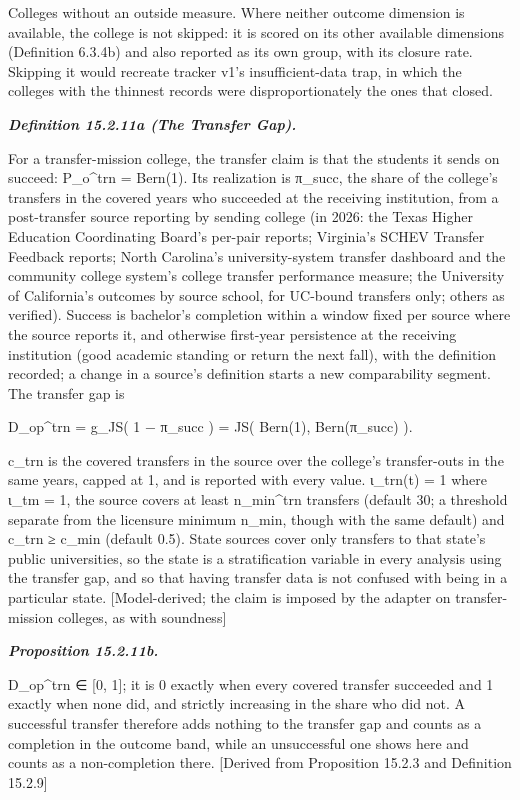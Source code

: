 \documentclass[
]{article}
\begin{document}
Colleges without an outside measure. Where neither outcome dimension is
available, the college is not skipped: it is scored on its other
available dimensions (Definition 6.3.4b) and also reported as its own
group, with its closure rate. Skipping it would recreate tracker v1's
insufficient-data trap, in which the colleges with the thinnest records
were disproportionately the ones that closed.

\emph{\textbf{Definition 15.2.11a (The Transfer Gap).}}

For a transfer-mission college, the transfer claim is that the students
it sends on succeed: P\_o\^{}trn = Bern(1). Its realization is π\_succ,
the share of the college's transfers in the covered years who succeeded
at the receiving institution, from a post-transfer source reporting by
sending college (in 2026: the Texas Higher Education Coordinating
Board's per-pair reports; Virginia's SCHEV Transfer Feedback reports;
North Carolina's university-system transfer dashboard and the community
college system's college transfer performance measure; the University of
California's outcomes by source school, for UC-bound transfers only;
others as verified). Success is bachelor's completion within a window
fixed per source where the source reports it, and otherwise first-year
persistence at the receiving institution (good academic standing or
return the next fall), with the definition recorded; a change in a
source's definition starts a new comparability segment. The transfer gap
is

D\_op\^{}trn = g\_JS( 1 − π\_succ ) = JS( Bern(1), Bern(π\_succ) ).

c\_trn is the covered transfers in the source over the college's
transfer-outs in the same years, capped at 1, and is reported with every
value. ι\_trn(t) = 1 where ι\_tm = 1, the source covers at least
n\_min\^{}trn transfers (default 30; a threshold separate from the
licensure minimum n\_min, though with the same default) and c\_trn ≥
c\_min (default 0.5). State sources cover only transfers to that state's
public universities, so the state is a stratification variable in every
analysis using the transfer gap, and so that having transfer data is not
confused with being in a particular state. {[}Model-derived; the claim
is imposed by the adapter on transfer-mission colleges, as with
soundness{]}

\emph{\textbf{Proposition 15.2.11b.}}

D\_op\^{}trn ∈ {[}0, 1{]}; it is 0 exactly when every covered transfer
succeeded and 1 exactly when none did, and strictly increasing in the
share who did not. A successful transfer therefore adds nothing to the
transfer gap and counts as a completion in the outcome band, while an
unsuccessful one shows here and counts as a non-completion there.
{[}Derived from Proposition 15.2.3 and Definition 15.2.9{]}
\end{document}
